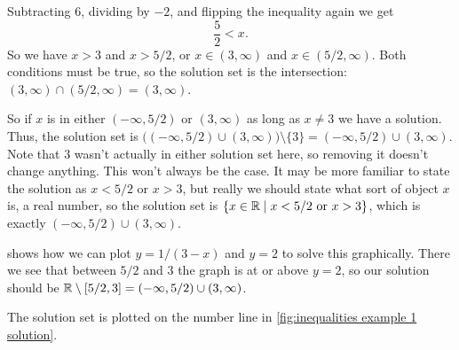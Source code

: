 \documentclass[fleqn]{LectureClass/LectureClass}
\begin{document}
\begin{exm}{}{}
\begin{enumerate}
            Subtracting \(6\), dividing by \(-2\), and flipping the inequality again we get
            \begin{equation}
                \frac{5}{2} < x.
            \end{equation}
            So we have \(x > 3\) and \(x > 5/2\), or \(x \in (3, \infty)\) and \(x \in (5/2, \infty)\).
            Both conditions must be true, so the solution set is the intersection: \((3, \infty) \cap (5/2, \infty) = (3, \infty)\).
        \end{enumerate}
        So if \(x\) is in either \((-\infty, 5/2)\) or \((3, \infty)\) as long as \(x \ne 3\) we have a solution.
        Thus, the solution set is \(\big((-\infty, 5/2) \cup (3, \infty)\big) \setminus \{3\} = (-\infty, 5/2) \cup (3, \infty)\).
        Note that \(3\) wasn't actually in either solution set here, so removing it doesn't change anything.
        This won't always be the case.
        It may be more familiar to state the solution as \(x < 5/2\) or \(x > 3\), but really we should state what sort of object \(x\) is, a real number, so the solution set is \(\{x \in \mathbb{R} \mid x < 5/2 \text{ or } x > 3\}\), which is exactly \((-\infty, 5/2) \cup (3, \infty)\).
        
         shows how we can plot \(y = 1/(3 - x)\) and \(y = 2\) to solve this graphically.
        There we see that between \(5/2\) and \(3\) the graph is at or above \(y = 2\), so our solution should be \(\mathbb{R} \setminus [5/2, 3] = (-\infty, 5/2) \cup (3, \infty)\).
        
        The solution set is plotted on the number line in \cref{fig:inequalities example 1 solution}.
    \end{exm}
    
\end{document}

